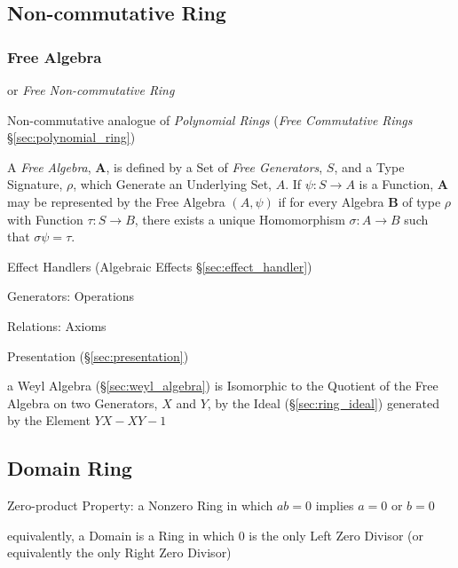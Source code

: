 \subsection{Non-commutative Ring}\label{sec:noncommutative_ring}

\subsubsection{Free Algebra}\label{sec:free_algebra}

or \emph{Free Non-commutative Ring}

Non-commutative analogue of \emph{Polynomial Rings} (\emph{Free Commutative
  Rings} \S\ref{sec:polynomial_ring})

A \emph{Free Algebra}, $\mathbf{A}$, is defined by a Set of \emph{Free
  Generators}, $S$, and a Type Signature, $\rho$, which Generate an
Underlying Set, $A$. If $\psi : S \rightarrow A$ is a Function,
$\mathbf{A}$ may be represented by the Free Algebra $(A,\psi)$ if for
every Algebra $\mathbf{B}$ of type $\rho$ with Function $\tau : S
\rightarrow B$, there exists a unique Homomorphism $\sigma : A
\rightarrow B$ such that $\sigma\psi = \tau$.

Effect Handlers (Algebraic Effects \S\ref{sec:effect_handler})

Generators: Operations

Relations: Axioms

Presentation (\S\ref{sec:presentation})

\fist a Weyl Algebra (\S\ref{sec:weyl_algebra}) is Isomorphic to the Quotient
of the Free Algebra on two Generators, $X$ and $Y$, by the Ideal
(\S\ref{sec:ring_ideal}) generated by the Element $YX - XY - 1$



\subsection{Domain Ring}\label{sec:domain_ring}

Zero-product Property: a Nonzero Ring in which $ab = 0$ implies $a = 0$ or
$b = 0$

equivalently, a Domain is a Ring in which $0$ is the only Left Zero Divisor (or
equivalently the only Right Zero Divisor)

